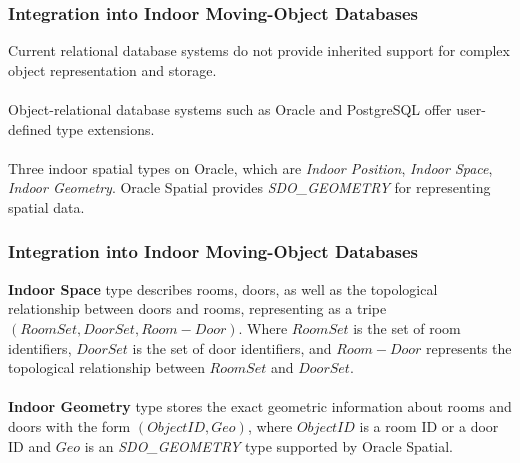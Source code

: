 \begin{frame}
\begin{columns}
\end{columns}

\end{frame}


\begin{frame}
\frametitle{Integration into Indoor Moving-Object Databases}

Current relational database systems do not provide inherited support for complex object representation and storage. \\~\\

Object-relational database systems such as Oracle and PostgreSQL offer user-defined type extensions. \\~\\

Three indoor spatial types on Oracle, which are \emph{Indoor Position}, \emph{Indoor Space}, \emph{Indoor Geometry}. Oracle Spatial provides \emph{SDO\_GEOMETRY} for representing spatial data.

\end{frame}


\begin{frame}
\frametitle{Integration into Indoor Moving-Object Databases}

\textbf{Indoor Space} type describes rooms, doors, as well as the topological relationship between doors and rooms, representing as a tripe $(RoomSet, DoorSet, Room-Door)$. Where $RoomSet$ is the set of room identifiers, $DoorSet$ is the set of door identifiers, and $Room-Door$ represents the topological relationship between $RoomSet$ and $DoorSet$.\\~\\

\textbf{Indoor Geometry} type stores the exact geometric information about rooms and doors with the form $(ObjectID, Geo)$, where $ObjectID$ is a room ID or a door ID and $Geo$ is an \emph{SDO\_GEOMETRY} type supported by Oracle Spatial.

\end{frame}

